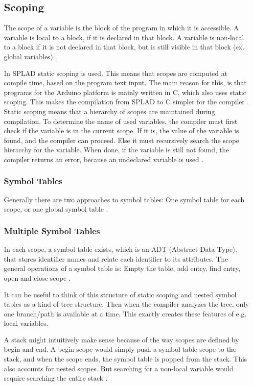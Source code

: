 \subsection{Scoping}
The scope of a variable is the block of the program in which it is accessible. A variable is local to a block, if it is declared in that block. A variable is non-local to a block if it is not declared in that block, but is still visible in that block (ex. global variables) \citep{sebesta}.

In SPLAD static scoping is used. This means that scopes are computed at compile time, based on the program text input. The main reason for this, is that programs for the Arduino platform is mainly written in C, which also uses static scoping. This makes the compilation from SPLAD to C simpler for the compiler \citep{arduinobuild}. Static scoping means that a hierarchy of scopes are maintained during compilation. To determine the name of used variables, the compiler must first check if the variable is in the current scope. If it is, the value of the variable is found, and the compiler can proceed. Else it must recursively search the scope hierarchy for the variable. When done, if the variable is still not found, the compiler returns an error, because an undeclared variable is used \citep{sebesta}.
\subsubsection{Symbol Tables}
Generally there are two approaches to symbol tables: One symbol table for each scope, or one global symbol table \citep{sebesta}. 
\subsubsection*{Multiple Symbol Tables}
In each scope, a symbol table exists, which is an ADT (Abstract Data Type), that stores identifier names and relate each identifier to its attributes. The general operations of a symbol table is: Empty the table, add entry, find entry, open and close scope \citep{sebesta}. 

It can be useful to think of this structure of static scoping and nested symbol tables as a kind of tree structure. Then when the compiler analyzes the tree, only one branch/path is available at a time. This exactly creates these features of e.g. local variables.

A stack might intuitively make sense because of the way scopes are defined by begin and end. A begin scope would simply push a symbol table scope to the stack, and when the scope ends, the symbol table is popped from the stack. This also accounts for nested scopes. But searching for a non-local variable would require searching the entire stack \citep{sebesta}. 

